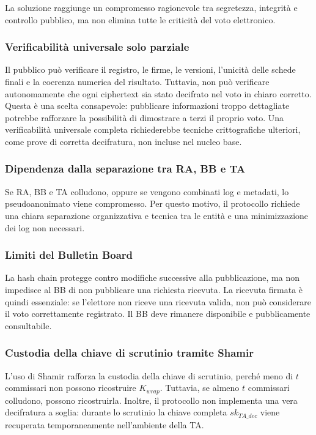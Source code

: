 \documentclass[12pt,a4paper]{article}
\newcommand{\sk}{\mathit{sk}}
\begin{document}
La soluzione raggiunge un compromesso ragionevole tra segretezza, integrit\`a e controllo pubblico, ma non elimina tutte le criticit\`a del voto elettronico.

\subsubsection*{Verificabilit\`a universale solo parziale}

Il pubblico pu\`o verificare il registro, le firme, le versioni, l'unicit\`a delle schede finali e la coerenza numerica del risultato. Tuttavia, non pu\`o verificare autonomamente che ogni ciphertext sia stato decifrato nel voto in chiaro corretto. Questa \`e una scelta consapevole: pubblicare informazioni troppo dettagliate potrebbe rafforzare la possibilit\`a di dimostrare a terzi il proprio voto. Una verificabilit\`a universale completa richiederebbe tecniche crittografiche ulteriori, come prove di corretta decifratura, non incluse nel nucleo base.

\subsubsection*{Dipendenza dalla separazione tra RA, BB e TA}

Se RA, BB e TA colludono, oppure se vengono combinati log e metadati, lo pseudoanonimato viene compromesso. Per questo motivo, il protocollo richiede una chiara separazione organizzativa e tecnica tra le entit\`a e una minimizzazione dei log non necessari.

\subsubsection*{Limiti del Bulletin Board}

La hash chain protegge contro modifiche successive alla pubblicazione, ma non impedisce al BB di non pubblicare una richiesta ricevuta. La ricevuta firmata \`e quindi essenziale: se l'elettore non riceve una ricevuta valida, non pu\`o considerare il voto correttamente registrato. Il BB deve rimanere disponibile e pubblicamente consultabile.

\subsubsection*{Custodia della chiave di scrutinio tramite Shamir}

L'uso di Shamir rafforza la custodia della chiave di scrutinio, perch\'e meno di $t$ commissari non possono ricostruire $K_{\mathit{wrap}}$. Tuttavia, se almeno $t$ commissari colludono, possono ricostruirla. Inoltre, il protocollo non implementa una vera decifratura a soglia: durante lo scrutinio la chiave completa $\sk_{\mathit{TA\_dec}}$ viene recuperata temporaneamente nell'ambiente della TA.
\end{document}
